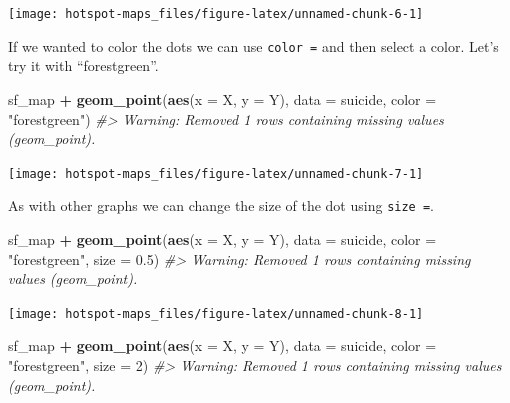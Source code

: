 \documentclass[
  12pt,
]{book}
\newenvironment{Shaded}{\begin{snugshade}}{\end{snugshade}}
\newcommand{\CommentTok}[1]{\textcolor[rgb]{0.56,0.35,0.01}{\textit{#1}}}
\newcommand{\DataTypeTok}[1]{\textcolor[rgb]{0.13,0.29,0.53}{#1}}
\newcommand{\DecValTok}[1]{\textcolor[rgb]{0.00,0.00,0.81}{#1}}
\newcommand{\FloatTok}[1]{\textcolor[rgb]{0.00,0.00,0.81}{#1}}
\newcommand{\KeywordTok}[1]{\textcolor[rgb]{0.13,0.29,0.53}{\textbf{#1}}}
\newcommand{\NormalTok}[1]{#1}
\newcommand{\OperatorTok}[1]{\textcolor[rgb]{0.81,0.36,0.00}{\textbf{#1}}}
\newcommand{\StringTok}[1]{\textcolor[rgb]{0.31,0.60,0.02}{#1}}
\begin{document}
\begin{center}\texttt{[image: hotspot-maps\_files/figure-latex/unnamed-chunk-6-1]} \end{center}

If we wanted to color the dots we can use \texttt{color\ =} and then select a color. Let's try it with ``forestgreen''.

\begin{Shaded}
\begin{Highlighting}[]
\NormalTok{sf\_map }\OperatorTok{+}
\StringTok{  }\KeywordTok{geom\_point}\NormalTok{(}\KeywordTok{aes}\NormalTok{(}\DataTypeTok{x =}\NormalTok{ X, }\DataTypeTok{y =}\NormalTok{ Y),}
             \DataTypeTok{data  =}\NormalTok{ suicide,}
             \DataTypeTok{color =} \StringTok{"forestgreen"}\NormalTok{)}
\CommentTok{\#> Warning: Removed 1 rows containing missing values (geom\_point).}
\end{Highlighting}
\end{Shaded}

\begin{center}\texttt{[image: hotspot-maps\_files/figure-latex/unnamed-chunk-7-1]} \end{center}

As with other graphs we can change the size of the dot using \texttt{size\ =}.

\begin{Shaded}
\begin{Highlighting}[]
\NormalTok{sf\_map }\OperatorTok{+}
\StringTok{  }\KeywordTok{geom\_point}\NormalTok{(}\KeywordTok{aes}\NormalTok{(}\DataTypeTok{x =}\NormalTok{ X, }\DataTypeTok{y =}\NormalTok{ Y),}
             \DataTypeTok{data  =}\NormalTok{ suicide,}
             \DataTypeTok{color =} \StringTok{"forestgreen"}\NormalTok{,}
             \DataTypeTok{size  =} \FloatTok{0.5}\NormalTok{)}
\CommentTok{\#> Warning: Removed 1 rows containing missing values (geom\_point).}
\end{Highlighting}
\end{Shaded}

\begin{center}\texttt{[image: hotspot-maps\_files/figure-latex/unnamed-chunk-8-1]} \end{center}

\begin{Shaded}
\begin{Highlighting}[]
\NormalTok{sf\_map }\OperatorTok{+}
\StringTok{  }\KeywordTok{geom\_point}\NormalTok{(}\KeywordTok{aes}\NormalTok{(}\DataTypeTok{x =}\NormalTok{ X, }\DataTypeTok{y =}\NormalTok{ Y),}
             \DataTypeTok{data  =}\NormalTok{ suicide,}
             \DataTypeTok{color =} \StringTok{"forestgreen"}\NormalTok{,}
             \DataTypeTok{size  =} \DecValTok{2}\NormalTok{)}
\CommentTok{\#> Warning: Removed 1 rows containing missing values (geom\_point).}
\end{Highlighting}
\end{Shaded}
\end{document}
